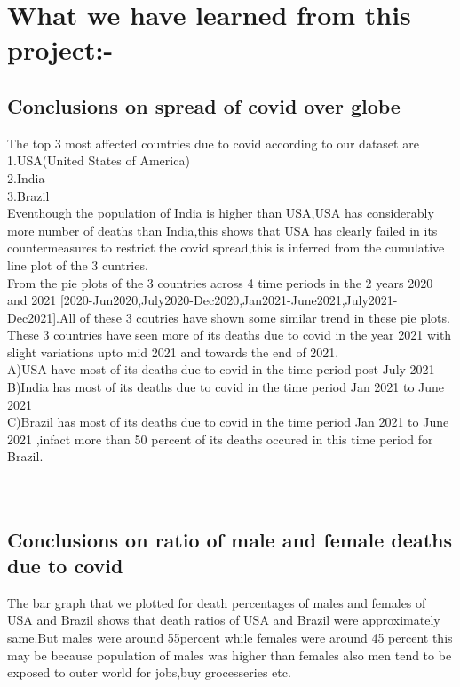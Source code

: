 \chapter{What we have learned from this project:-}
\section{Conclusions on spread of covid over globe}
The top 3 most affected countries due to covid according to our dataset are \\
1.USA(United States of America)\\
2.India\\
3.Brazil\\
Eventhough the population of India is higher than USA,USA has considerably more number of deaths than India,this shows that USA has clearly failed in its countermeasures to restrict the covid spread,this is inferred from the cumulative line plot of the 3 cuntries.\\
From the pie plots of the 3 countries across 4 time periods in the 2 years 2020 and 2021 [2020-Jun2020,July2020-Dec2020,Jan2021-June2021,July2021-Dec2021].All of these 3 coutries have shown some similar trend in these pie plots.\\
These 3 countries have seen more of its deaths due to covid in the year 2021 with slight variations upto mid 2021 and towards the end of 2021.\\
A)USA have most of its deaths due to covid in the time period post July 2021\\
B)India has most of its deaths due to covid in the time period Jan 2021 to June 2021\\
C)Brazil has most of its deaths due to covid in the time period Jan 2021 to June 2021 ,infact more than 50 percent of its deaths occured in this time period for Brazil.
\\
\\
\\
\section{Conclusions on ratio of male and female deaths due to covid}
The bar graph that we plotted for death percentages of males and females of USA and Brazil shows that death ratios of USA and Brazil were approximately same.But males were around 55percent while females were around 45 percent this may be because population of males was higher than females also men tend to be exposed to outer world for jobs,buy grocesseries etc.\\
\\
\\
\\
\\ 
